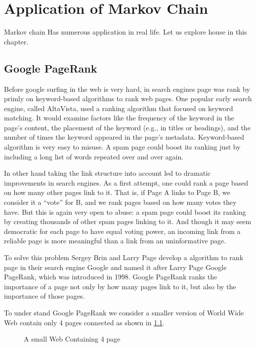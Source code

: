 \chapter{Application of Markov Chain}
Markov chain Has  numerous application in real life. Let us explore house in this chapter.

\section{Google PageRank}
Before google surfing in the web is very hard, in search engines page was rank by primly on keyword-based algorithms to rank web pages. 
One popular early search engine, called AltaVista, used a ranking algorithm that focused on keyword matching. 
It would examine factors like the frequency of the keyword in the page's content, 
the placement of the keyword (e.g., in titles or headings), and the number of times the keyword appeared in the page's metadata.
Keyword-based algorithm is very easy to misuse. A spam page could boost its ranking
just by including a long list of words repeated over and over again.

In other hand taking the link structure into account led to dramatic improvements
in search engines. As a first attempt, one could rank a page based on how many
other pages link to it. That is, if Page A links to Page B, we consider it a “vote”
for B, and we rank pages based on how many votes they have.
But this is again very open to abuse: a spam page could boost its ranking by creating
thousands of other spam pages linking to it.
And though it may seem democratic
for each page to have equal voting power, an incoming link from a reliable page is
more meaningful than a link from an uninformative page.

To solve this problem Sergey Brin and Larry Page develop a algorithm to rank page
in their search engine Google and named it after Larry Page Google PageRank, 
which was introduced in 1998. Google PageRank ranks
the importance of a page not only by how many pages link to it, but also by the
importance of those pages.

To under stand Google PageRank we consider a smaller version of World Wide Web 
contain only 4 pages connected as shown in \cref{A small Web Containing 4 page}.

\begin{figure}[H]
    \centering
    \caption{A small Web Containing 4 page}
    \label{A small Web Containing 4 page}
\end{figure}

